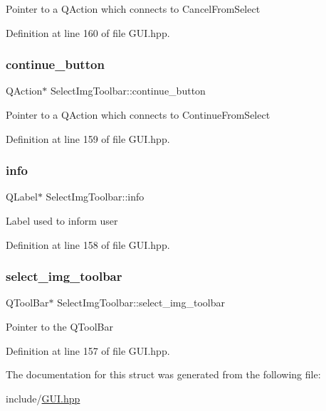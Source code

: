Pointer to a Q\+Action which connects to Cancel\+From\+Select 

Definition at line 160 of file G\+U\+I.\+hpp.

\mbox{\label{structSelectImgToolbar_a82569764f9d7e13b406a668e9e50290a}} 
\subsubsection{\texorpdfstring{continue\+\_\+button}{continue\_button}}
{\footnotesize\ttfamily Q\+Action$\ast$ Select\+Img\+Toolbar\+::continue\+\_\+button}

Pointer to a Q\+Action which connects to Continue\+From\+Select 

Definition at line 159 of file G\+U\+I.\+hpp.

\mbox{\label{structSelectImgToolbar_a3cf6ac92fbe60877873c89939217e1de}} 
\subsubsection{\texorpdfstring{info}{info}}
{\footnotesize\ttfamily Q\+Label$\ast$ Select\+Img\+Toolbar\+::info}

Label used to inform user 

Definition at line 158 of file G\+U\+I.\+hpp.

\mbox{\label{structSelectImgToolbar_a779bc326cf08c9fbcd1ffebb43a664eb}} 
\subsubsection{\texorpdfstring{select\+\_\+img\+\_\+toolbar}{select\_img\_toolbar}}
{\footnotesize\ttfamily Q\+Tool\+Bar$\ast$ Select\+Img\+Toolbar\+::select\+\_\+img\+\_\+toolbar}

Pointer to the Q\+Tool\+Bar 

Definition at line 157 of file G\+U\+I.\+hpp.



The documentation for this struct was generated from the following file\+:\begin{DoxyCompactItemize}
\item 
include/\mbox{\hyperlink{GUI_8hpp}{G\+U\+I.\+hpp}}\end{DoxyCompactItemize}
